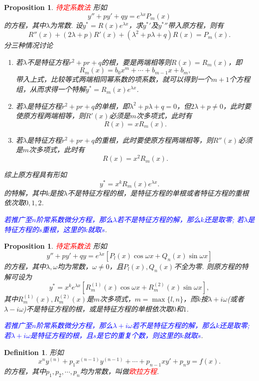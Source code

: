 \documentclass{article}
\newtheorem{proposition}[theorem]{Proposition}
\newtheorem{definition}[theorem]{Definition}
\newcommand{\redt}[1]{\textcolor{red}{#1}}
\newcommand{\bluet}[1]{\textcolor{blue}{#1}}
\begin{document}
\begin{proposition}
\rm \redt{待定系数法} 形如
$$
y''+py' +qy = e^{\lambda x}P_m(x)
$$
的方程，其中$\lambda$为常数. 设$y^* = R(x)e^{\lambda x}$，求${y^*}'$及${y^*}''$带入原方程，则有
$$
R''(x) + (2\lambda + p)R'(x) + (\lambda^2 + p\lambda +q)R(x) = P_m(x).
$$
分三种情况讨论
\begin{enumerate}
	\item 若$\lambda$不是特征方程$r^2+pr+q$的根，要是两端相等则$R(x) = R_m(x)$，即
	$$
	R_m(x) = b_0 x^{m} + \cdots + b_{m-1}x+ b_m,
	$$ 
	带入上式，比较等式两端相同幂系数的项系数，就可以得到一个$m+1$个方程组，从而求得一个特解$y^* = R_m(x)e^{\lambda x}$. 
	\item 若$\lambda$是特征方程$r^2 + pr+ q$的单根，即$\lambda^2 + p\lambda +q =0$，但$2\lambda+p \neq 0$，此时要使原方程两端相等，则$R'(x)$必须是$m$次多项式，此时有
	$$
	R(x) = xR_m(x).
	$$
	\item 若$\lambda$是特征方程$r^2 + pr + q$的重根，此时要使原方程两端相等，则$R''(x)$必须是$m$次多项式，此时有
	$$
	R(x) = x^2R_m(x).
	$$
\end{enumerate}
综上原方程具有形如
$$
y^* = x^kR_m(x)e^{\lambda x}.
$$
的特解，其中$k$是按$\lambda$不是特征方程的根，是特征方程的单根或者特征方程的重根依次取$0,1,2$. 

\bluet{若推广至$n$阶常系数微分方程，那么$\lambda$若不是特征方程的解，那么$k$还是取零; 若$\lambda$是特征方程的$s$重根，这里的$k$就取$s$}. 
\end{proposition}


\begin{proposition}
\rm \redt{待定系数法} 形如
$$
y''+py' +qy = e^{\lambda x}[P_l(x)\cos \omega x + Q_n(x)\sin \omega x]
$$
的方程，其中$\lambda,\omega$均为常数，$\omega \neq 0$，且$P_l(x),Q_n(x)$不全为零. 则原方程的特解可设为
$$
y^* = x^ke^{\lambda x}[R_m^{(1)}(x)\cos\omega x + R_m^{(2)}(x)\sin\omega x],
$$
其中$R_m^{(1)}(x),R_m^{(2)}(x)$是$m$次多项式，$m=\max\{l,n\}$，而$k$按$\lambda + i\omega$(或者$\lambda-i\omega$)不是特征方程的根，或是特征方程的单根依次取$0$和$1$. 

\bluet{若推广至$n$阶常系数微分方程，那么$\lambda+i\omega$若不是特征方程的解，那么$k$还是取零; 若$\lambda+i\omega$是特征方程的根，且$s$是它的重复个数，则这里的$k$就取$s$}. 
\end{proposition}

\begin{definition}
\rm 形如
$$
x^ny^{(n)} + p_1x^{(n-1)}y^{(n-1)} + \cdots + p_{n-1}xy' + p_ny =f(x).
$$
的方程，其中$p_1,p_2,\cdots,p_n$均为常数，叫做\redt{欧拉方程}. 
\end{definition}
\end{document}
